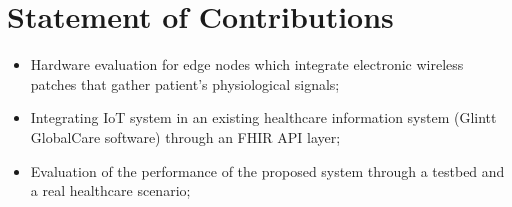 \section{Statement of Contributions}


\begin{itemize}
    \item Hardware evaluation for edge nodes which integrate electronic wireless patches that gather patient's physiological signals;
    \item Integrating IoT system in an existing healthcare information system  (Glintt GlobalCare software) through an FHIR API layer;
    \item Evaluation of the performance of the proposed system through a testbed and a real healthcare scenario;
\end{itemize}

